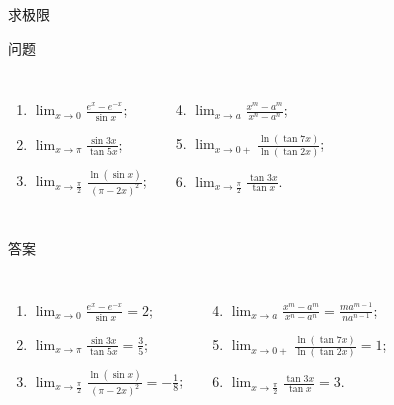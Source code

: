 \documentclass[
10pt,
aspectratio=43,
]{beamer}
\begin{document}
\begin{frame}[fragile]{求极限}
	\begin{block}{问题}
		\begin{columns}[onlytextwidth]
			\begin{enumerate}
				\item $\displaystyle\lim _{x \rightarrow 0} \frac{e^x-e^{-x}}{\sin x}$;
				\item $\displaystyle\lim _{x \rightarrow \pi } \frac{\sin 3 x}{\tan 5 x}$;
				\item $\displaystyle\lim _{x \rightarrow \frac{\pi}{2}} \frac{\ln (\sin x)}{(\pi-2 x)^2}$;
			\end{enumerate}
			\begin{enumerate} \setcounter{enumi}{3}
				\item $\displaystyle\lim _{x \rightarrow a} \frac{x^m-a^m}{x^n-a^n}$;
				\item $\displaystyle\lim _{x \rightarrow 0+} \frac{\ln (\tan 7 x)}{\ln (\tan 2 x)}$;
				\item $\displaystyle\lim _{x \rightarrow \frac{\pi}{2}} \frac{\tan 3 x}{\tan x}$.
			\end{enumerate}
		\end{columns}
	\end{block}

	\pause

	\begin{exampleblock}{答案}
		\begin{columns}[onlytextwidth]
			\begin{enumerate}
				\item $\displaystyle\lim _{x \rightarrow 0} \frac{e^x-e^{-x}}{\sin x} = 2$; \pause
				\item $\displaystyle\lim _{x \rightarrow \pi } \frac{\sin 3 x}{\tan 5 x} = \frac{3}{5}$; \pause
				\item $\displaystyle\lim _{x \rightarrow \frac{\pi}{2}} \frac{\ln (\sin x)}{(\pi-2 x)^2} = -\frac{1}{8}$; \pause
			\end{enumerate}
			\begin{enumerate} \setcounter{enumi}{3}
				\item $\displaystyle\lim _{x \rightarrow a} \frac{x^m-a^m}{x^n-a^n} = \frac{m a^{m-1}}{n a^{n-1}}$; \pause
				\item $\displaystyle\lim _{x \rightarrow 0+} \frac{\ln (\tan 7 x)}{\ln (\tan 2 x)} = 1$; \pause
				\item $\displaystyle\lim _{x \rightarrow \frac{\pi}{2}} \frac{\tan 3 x}{\tan x} = 3.$
			\end{enumerate}
		\end{columns}
	\end{exampleblock}
\end{frame}
\end{document}
